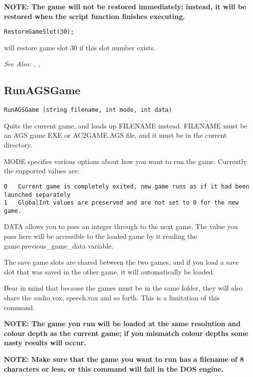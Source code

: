 \bf{NOTE:} The game will not be restored immediately; instead, it will be
restored when the script function finishes executing.

\begin{verbatim}
RestoreGameSlot(30);
\end{verbatim}
will restore game slot 30 if this slot number exists.

\it{See Also:} ,
, 


\subsection{RunAGSGame}\label{RunAGSGame}%

\begin{verbatim}
RunAGSGame (string filename, int mode, int data)
\end{verbatim}
Quits the current game, and loads up FILENAME instead. FILENAME must be an AGS game EXE
or AC2GAME.AGS file, and it must be in the current directory.

MODE specifies various options about how you want to run the game. Currently the supported
values are:
\begin{verbatim}
0   Current game is completely exited, new game runs as if it had been launched separately
1   GlobalInt values are preserved and are not set to 0 for the new game.
\end{verbatim}

DATA allows you to pass an integer through to the next game. The value you pass here
will be accessible to the loaded game by it reading the  game.previous_game_data  variable.

The save game slots are shared between the two games, and if you load a save slot that
was saved in the other game, it will automatically be loaded.

Bear in mind that because the games must be in the same folder, they will also share
the audio.vox, speech.vox and so forth. This is a limitation of this command.

\bf{NOTE:} The game you run will be loaded at the same resolution and colour depth as the
current game; if you mismatch colour depths some nasty results will occur.

\bf{NOTE:} Make sure that the game you want to run has a filename of 8 characters or less,
or this command will fail in the DOS engine.

